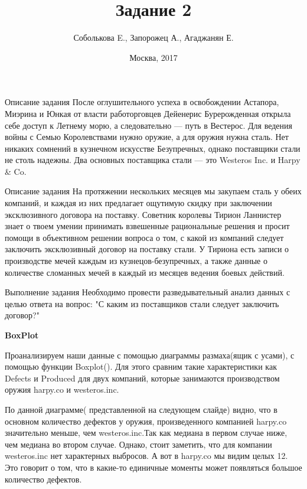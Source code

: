 \documentclass{beamer}
\title{Задание 2}
\author{Соболькова E., Запорожец А., Агаджанян Е.}
\institute{МГУ имени М. В. Ломоносова}
\date{Москва, 2017}
\begin{document}
	\maketitle
	
\begin{frame}{Описание задания} 
	После оглушительного успеха в освобождении Астапора, Миэрина и Юнкая от власти работорговцев Дейенерис Бурерожденная открыла себе доступ к Летнему морю, а следовательно — путь в Вестерос. 
	Для ведения войны с Семью Королевствами нужно оружие, а для оружия нужна сталь. Нет никаких сомнений в кузнечном искусстве Безупречных, однако поставщики стали не столь надежны. 
	Два основных поставщика стали — это Westeros Inc. и Harpy \& Co. 
\end{frame} 

\begin{frame}{Описание задания} 
На протяжении нескольких месяцев мы закупаем сталь у обеих компаний, и каждая из них предлагает ощутимую скидку при заключении эксклюзивного договора на поставку.
Советник королевы Тирион Ланнистер знает о твоем умении принимать взвешенные рациональные решения и просит помощи в объективном решении вопроса о том, с какой из компаний следует заключить эксклюзивный договор на поставку стали. 
У Тириона есть записи о производстве мечей каждым из кузнецов-безупречных, а также данные о количестве сломанных мечей в каждый из месяцев ведения боевых действий. 
\end{frame} 

\begin{frame}{Выполнение задания} 
Необходимо провести разведывательный анализ данных с целью ответа на вопрос: "С каким из поставщиков стали следует заключить договор?"
\end{frame}
\begin{frame}
\textbf{BoxPlot}

Проанализируем наши данные с помощью диаграммы размаха(ящик с усами), с помощью функции Boxplot(). Для этого сравним такие характеристики как Defects и Produced для двух компаний, которые занимаются производством оружия harpy.co и westeros.inc.

По данной диаграмме( представленной на следующем слайде) видно, что в основном количество дефектов у оружия, произведенного компанией harpy.co значительно меньше, чем westeros.inc.Так как медиана в первом случае ниже, чем медиана во втором случае. Однако, стоит заметить, что для компании westeros.inc нет характерных выбросов. А вот в harpy.co мы видим целых 12. Это говорит о том, что в какие-то единичные моменты может появляться большое количество дефектов.
\end{frame}
\end{document}
